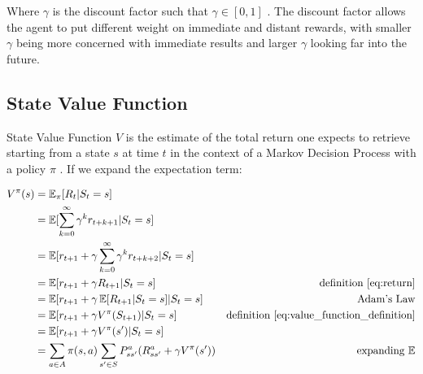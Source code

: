 Where $\gamma$ is the discount factor such that $\gamma \in [0, 1]$ \cite{lecture_lets_go_markov}. The discount factor allows the agent to put different weight on immediate and distant rewards, with smaller $\gamma$ being more concerned with immediate results and larger $\gamma$ looking far into the future. 



\subsection{State Value Function}
State Value Function $V$ is the estimate of the total return one expects to retrieve starting from a state $s$ at time $t$ in the context of a Markov Decision Process with a policy $\pi$ \cite{lecture_lets_go_markov}. If we expand the expectation term:
%      

\begin{align}
    V^{\pi}(s) &= \operatorname{\mathbb{E}}_{\pi}[R_{t} | S_t = s]  \label{eq:value_function_definition} \\
    &= \operatorname{\mathbb{E}}[\sum^{\infty}_{k=0} \gamma^k r_{t+k+1} | S_t = s] \nonumber \\
    &= \operatorname{\mathbb{E}}[r_{t+1} + \gamma \sum^{\infty}_{k=0} \gamma^k r_{t+k+2} | S_t = s] \nonumber \\
    &= \operatorname{\mathbb{E}}[r_{t+1} + \gamma R_{t+1} | S_t = s] & \text{definition \ref{eq:return}} \nonumber \\
    &= \operatorname{\mathbb{E}}[r_{t+1} + \gamma \operatorname{\mathbb{E}}[R_{t+1} | S_t = s] | S_t = s] & \text{Adam's Law} \nonumber \\
    &= \operatorname{\mathbb{E}}[r_{t+1} + \gamma V^{\pi}(S_{t+1}) | S_t = s] & \text{definition \ref{eq:value_function_definition}} \nonumber \\
    &= \operatorname{\mathbb{E}}[r_{t+1} + \gamma V^{\pi}(s') | S_t = s] \nonumber \\
    &= \sum_{a \in A} \pi(s, a) \sum_{s' \in S} P^{a}_{ss'} (R^{a}_{ss'} + \gamma V^{\pi}(s')) &\text{expanding $\operatorname{\mathbb{E}}$} \label{eq:mdp_value_function_expansion}
    \label{eq:value_function_def}
\end{align}

